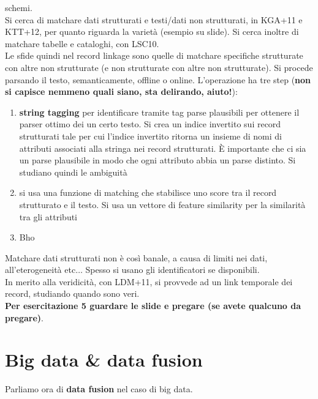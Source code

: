 \documentclass[a4paper,12pt, oneside]{book}
\begin{document}
schemi.\\
Si cerca di matchare dati strutturati e testi/dati non strutturati, in
KGA+11 e KTT+12, per quanto riguarda la varietà (esempio su slide). Si cerca
inoltre di matchare tabelle e cataloghi, con LSC10. \\
Le sfide quindi nel record linkage sono
quelle di matchare specifiche strutturate con altre non strutturate (e non
strutturate con altre non strutturate). Si procede parsando il testo,
semanticamente, offline o online. L'operazione ha tre step (\textbf{non si
  capisce nemmeno quali siano, sta delirando, aiuto!}):
\begin{enumerate}
  \item \textbf{string tagging} per identificare tramite tag parse plausibili
  per ottenere il parser ottimo dei un certo testo. Si crea un indice invertito
  sui record strutturati tale per cui l'indice invertito ritorna un insieme di
  nomi di attributi associati alla stringa nei record strutturati. È importante
  che ci sia un parse plausibile in modo che ogni attributo abbia un parse
  distinto. Si studiano quindi le ambiguità
  \item si usa una funzione di matching che stabilisce uno score tra il record
  strutturato e il testo. Si usa un vettore di feature similarity per la
  similarità tra gli attributi
  \item Bho
\end{enumerate}
Matchare dati strutturati non è così banale, a causa di limiti nei dati,
all'eterogeneità etc$\ldots$ Spesso si usano gli identificatori se
disponibili.\\
In merito alla veridicità, con LDM+11, si provvede ad un link temporale dei
record, studiando quando sono veri. \\
\textbf{Per esercitazione 5 guardare le slide e pregare (se avete qualcuno da
  pregare)}. 
\section{Big data \& data fusion}
Parliamo ora di \textbf{data fusion} nel caso di big data.\\
\end{document}
